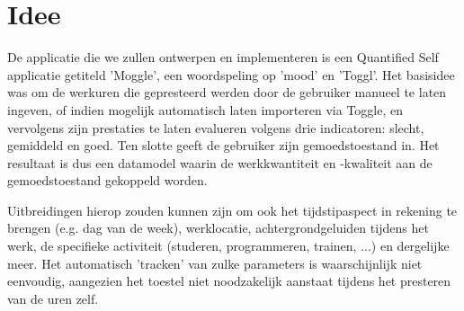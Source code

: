 \chapter{Idee}\label{chapter:idee}

De applicatie die we zullen ontwerpen en implementeren is een Quantified Self applicatie getiteld 'Moggle', een woordspeling op 'mood' en 'Toggl'. Het basisidee was om de werkuren die gepresteerd werden door de gebruiker manueel te laten ingeven, of indien mogelijk automatisch laten importeren via Toggle, en vervolgens zijn prestaties te laten evalueren volgens drie indicatoren: slecht, gemiddeld en goed. Ten slotte geeft de gebruiker zijn gemoedstoestand in. Het resultaat is dus een datamodel waarin de werkkwantiteit en -kwaliteit aan de gemoedstoestand gekoppeld worden.

Uitbreidingen hierop zouden kunnen zijn om ook het tijdstipaspect in rekening te brengen (e.g. dag van de week), werklocatie, achtergrondgeluiden tijdens het werk, de specifieke activiteit (studeren, programmeren, trainen, ...) en dergelijke meer. Het automatisch 'tracken' van zulke parameters is waarschijnlijk niet eenvoudig, aangezien het toestel niet noodzakelijk aanstaat tijdens het presteren van de uren zelf.